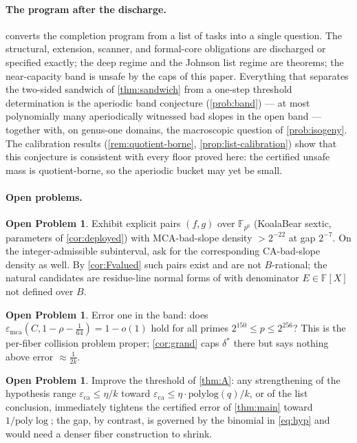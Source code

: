 \documentclass[11pt]{article}
\theoremstyle{definition}
\newtheorem{problem}[theorem]{Open Problem}
\theoremstyle{remark}
\newcommand{\F}{\mathbb{F}}
\newcommand{\B}{B}
\newcommand{\eca}{\varepsilon_{\mathrm{ca}}}
\newcommand{\emca}{\varepsilon_{\mathrm{mca}}}
\begin{document}
\paragraph{The program after the discharge.}  converts the completion program from a list of tasks into a single question. The structural, extension, scanner, and formal-core obligations are discharged or specified exactly; the deep regime and the Johnson list regime are theorems; the near-capacity band is unsafe by the caps of this paper. Everything that separates the two-sided sandwich of \cref{thm:sandwich} from a one-step threshold determination is the aperiodic band conjecture (\cref{prob:band}) --- at most polynomially many aperiodically witnessed bad slopes in the open band --- together with, on genus-one domains, the macroscopic question of \cref{prob:isogeny}. The calibration results (\cref{rem:quotient-borne}, \cref{prop:list-calibration}) show that this conjecture is consistent with every floor proved here: the certified unsafe mass is quotient-borne, so the aperiodic bucket may yet be small.

\paragraph{Open problems.}

\begin{problem}\label{prob:explicit}
Exhibit explicit pairs $(f,g)$ over $\F_{p^6}$ (KoalaBear sextic, parameters of \cref{cor:deployed}) with MCA-bad-slope density $>2^{-22}$ at gap $2^{-7}$. On the integer-admissible subinterval, ask for the corresponding CA-bad-slope density as well. By \cref{cor:Fvalued} such pairs exist and are not $\B$-rational; the natural candidates are residue-line normal forms of \cite{Cho26b} with denominator $E\in\F[X]$ not defined over $\B$.
\end{problem}

\begin{problem}\label{prob:errorone}
Error one in the band: does $\emca(C,1-\rho-\frac1{64})=1-o(1)$ hold for all primes $2^{150}\le p\le2^{256}$? This is the per-fiber collision problem proper; \cref{cor:grand} caps $\delta^*$ there but says nothing above error $\approx\frac1{2k}$.
\end{problem}

\begin{problem}
Improve the threshold of \cref{thm:A}: any strengthening of the hypothesis range $\eca\le\eta/k$ toward $\eca\le\eta\cdot\mathrm{polylog}(q)/k$, or of the list conclusion, immediately tightens the certified error of \cref{thm:main} toward $1/\mathrm{poly}\log$; the gap, by contrast, is governed by the binomial in \eqref{eq:hyp} and would need a denser fiber construction to shrink.
\end{problem}
\end{document}
